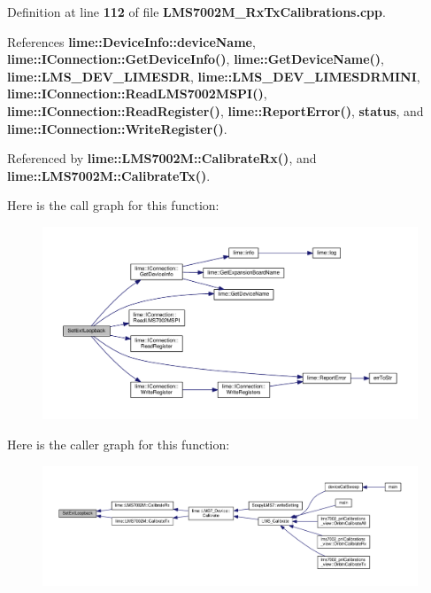 Definition at line {\bf 112} of file {\bf L\+M\+S7002\+M\+\_\+\+Rx\+Tx\+Calibrations.\+cpp}.



References {\bf lime\+::\+Device\+Info\+::device\+Name}, {\bf lime\+::\+I\+Connection\+::\+Get\+Device\+Info()}, {\bf lime\+::\+Get\+Device\+Name()}, {\bf lime\+::\+L\+M\+S\+\_\+\+D\+E\+V\+\_\+\+L\+I\+M\+E\+S\+DR}, {\bf lime\+::\+L\+M\+S\+\_\+\+D\+E\+V\+\_\+\+L\+I\+M\+E\+S\+D\+R\+M\+I\+NI}, {\bf lime\+::\+I\+Connection\+::\+Read\+L\+M\+S7002\+M\+S\+P\+I()}, {\bf lime\+::\+I\+Connection\+::\+Read\+Register()}, {\bf lime\+::\+Report\+Error()}, {\bf status}, and {\bf lime\+::\+I\+Connection\+::\+Write\+Register()}.



Referenced by {\bf lime\+::\+L\+M\+S7002\+M\+::\+Calibrate\+Rx()}, and {\bf lime\+::\+L\+M\+S7002\+M\+::\+Calibrate\+Tx()}.



Here is the call graph for this function\+:
\nopagebreak
\begin{figure}[H]
\begin{center}
\leavevmode
\includegraphics[width=350pt]{d6/d0b/LMS7002M__RxTxCalibrations_8cpp_a6b3de4343e7fdcbfb5bc8cf53d5a5ea6_cgraph}
\end{center}
\end{figure}




Here is the caller graph for this function\+:
\nopagebreak
\begin{figure}[H]
\begin{center}
\leavevmode
\includegraphics[width=350pt]{d6/d0b/LMS7002M__RxTxCalibrations_8cpp_a6b3de4343e7fdcbfb5bc8cf53d5a5ea6_icgraph}
\end{center}
\end{figure}


